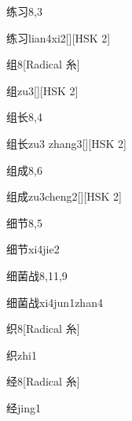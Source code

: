 \begin{entry}{练习}{8,3}
  \begin{phonetics}{练习}{lian4xi2}[][HSK 2]
  \end{phonetics}
\end{entry}

\begin{entry}{组}{8}[Radical 糸]
  \begin{phonetics}{组}{zu3}[][HSK 2]
  \end{phonetics}
\end{entry}

\begin{entry}{组长}{8,4}
  \begin{phonetics}{组长}{zu3 zhang3}[][HSK 2]
  \end{phonetics}
\end{entry}

\begin{entry}{组成}{8,6}
  \begin{phonetics}{组成}{zu3cheng2}[][HSK 2]
  \end{phonetics}
\end{entry}

\begin{entry}{细节}{8,5}
  \begin{phonetics}{细节}{xi4jie2}
  \end{phonetics}
\end{entry}

\begin{entry}{细菌战}{8,11,9}
  \begin{phonetics}{细菌战}{xi4jun1zhan4}
  \end{phonetics}
\end{entry}

\begin{entry}{织}{8}[Radical 糸]
  \begin{phonetics}{织}{zhi1}
  \end{phonetics}
\end{entry}

\begin{entry}{经}{8}[Radical 糸]
  \begin{phonetics}{经}{jing1}
  \end{phonetics}
\end{entry}


